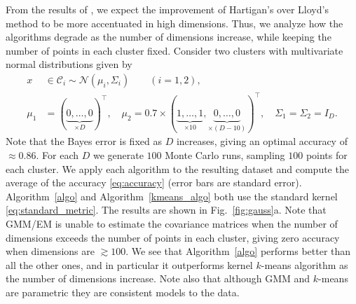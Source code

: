 \documentclass[aps,preprint,nofootinbib,floatfix]{revtex4-1}
\newcommand\C{{\mathcal{C}}}
\begin{document}
From the results of \cite{Telgarsky}, we expect the improvement of Hartigan's 
over Lloyd's method to be more accentuated in high dimensions.
Thus, we analyze
how the algorithms degrade as the number of dimensions increase, while
keeping the number of points in each cluster fixed. Consider
two clusters with multivariate normal distributions given by
\begin{equation}
\label{eq:gauss1}
\begin{split}
x &\in \C_i  \sim 
\mathcal{N}(\mu_i,\Sigma_i) \qquad (i=1,2),  \\
\mu_1 &= (\underbrace{0,\dotsc,0}_{\times D})^\top , \quad
\mu_2 = 0.7 \times (\underbrace{1,\dots,1}_{\times 10},
\underbrace{0,\dots,0}_{\times (D-10)})^\top, \quad
\Sigma_1 = \Sigma_2 = I_D.
\end{split}
\end{equation}
Note that the Bayes error
is fixed as $D$ increases, giving an optimal 
accuracy of $\approx 0.86$.
For each $D$ we generate $100$ Monte Carlo runs, sampling $100$ points for each cluster.
We apply each algorithm to the resulting dataset 
and compute the average of the accuracy \eqref{eq:accuracy} (error bars
are standard error).
Algorithm~\ref{algo} and Algorithm~\ref{kmeans_algo} 
both use the standard
kernel \eqref{eq:standard_metric}.
The results are shown in Fig.~\ref{fig:gauss}a.
Note that GMM/EM is unable to estimate the covariance matrices
when the number of dimensions exceeds the number of points in each cluster,
giving zero accuracy when dimensions are $\gtrsim 100$.
We see that Algorithm~\ref{algo} performs better than all the other ones,
and in particular it outperforms kernel $k$-means algorithm as the number
of dimensions increase. 
Note also that although GMM and $k$-means are
parametric they are consistent models to the data.
\end{document}
